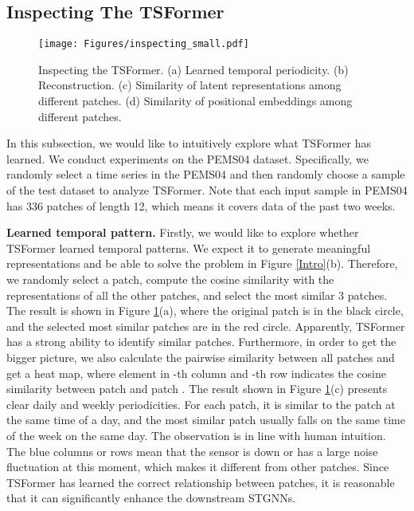\documentclass[sigconf]{acmart}
\begin{document}
\subsection{Inspecting The TSFormer}
\label{sec_inspecting}

\begin{figure}[t]
    \setlength{\abovecaptionskip}{0.2cm}
    \setlength{\belowcaptionskip}{-0.4cm}
  \centering
  \texttt{[image: Figures/inspecting\_small.pdf]}
  \caption{Inspecting the TSFormer. (a) Learned temporal periodicity. (b) Reconstruction. (c) Similarity of  latent representations among different patches. (d) Similarity of positional embeddings among different patches.}
  \label{inspecting}
\end{figure}

In this subsection, we would like to intuitively explore what TSFormer has learned.
We conduct experiments on the PEMS04 dataset.
Specifically, we randomly select a time series in the PEMS04 and then randomly choose a sample of the test dataset to analyze TSFormer.
Note that each input sample in PEMS04 has 336 patches of length 12, which means it covers data of the past two weeks.

\noindent\textbf{Learned temporal pattern.}
Firstly, we would like to explore whether TSFormer learned temporal patterns.
We expect it to generate meaningful representations and be able to solve the problem in Figure \ref{Intro}(b).
Therefore, we randomly select a patch, compute the cosine similarity with the representations of all the other patches, and select the most similar 3 patches. The result is shown in Figure \ref{inspecting}(a), where the original patch is in the black circle, and the selected most similar patches are in the red circle. 
Apparently, TSFormer has a strong ability to identify similar patches.
Furthermore, in order to get the bigger picture, we also calculate the pairwise similarity between all patches and get a  heat map, where element in -th column and -th row indicates the cosine similarity between patch  and patch .
The result shown in Figure \ref{inspecting}(c) presents clear daily and weekly periodicities.
For each patch, it is similar to the patch at the same time of a day, and the most similar patch usually falls on the same time of the week on the same day. 
The observation is in line with human intuition.
The blue columns or rows mean that the sensor is down or has a large noise fluctuation at this moment, which makes it different from other patches.
Since TSFormer has learned the correct relationship between patches, it is reasonable that it can significantly enhance the downstream STGNNs.
\end{document}
